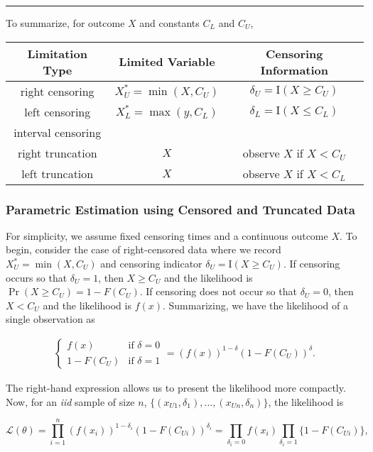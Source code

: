 \documentclass[]{book}
\theoremstyle{definition}
\theoremstyle{definition}
\theoremstyle{definition}
\theoremstyle{remark}
\begin{document}
\begin{center}\rule{0.5\linewidth}{\linethickness}\end{center}

To summarize, for outcome \(X\) and constants \(C_L\) and \(C_U\),

\begin{longtable}[]{@{}ccc@{}}
\toprule
Limitation Type & Limited Variable & Censoring
Information\tabularnewline
\midrule
\endhead
right censoring & \(X_U^{\ast}= \min(X, C_U)\) &
\(\delta_U= \mathrm{I}(X \geq C_U)\)\tabularnewline
left censoring & \(X_L^{\ast}= \max(y, C_L)\) &
\(\delta_L= \mathrm{I}(X \leq C_L)\)\tabularnewline
interval censoring & &\tabularnewline
right truncation & \(X\) & observe \(X\) if \(X < C_U\)\tabularnewline
left truncation & \(X\) & observe \(X\) if \(X < C_L\)\tabularnewline
\bottomrule
\end{longtable}

\subsubsection{Parametric Estimation using Censored and Truncated
Data}\label{parametric-estimation-using-censored-and-truncated-data}

For simplicity, we assume fixed censoring times and a continuous outcome
\(X\). To begin, consider the case of right-censored data where we
record \(X_U^{\ast}= \min(X, C_U)\) and censoring indicator
\(\delta_U= \mathrm{I}(X \geq C_U)\). If censoring occurs so that
\(\delta_U=1\), then \(X \geq C_U\) and the likelihood is
\(\Pr(X \geq C_U) = 1-F(C_U)\). If censoring does not occur so that
\(\delta_U=0\), then \(X < C_U\) and the likelihood is \(f(x)\).
Summarizing, we have the likelihood of a single observation as

\[\begin{aligned}
\left\{
\begin{array}{ll}
f(x) & \text{if } \delta = 0 \\
1-F(C_U) & \text{if }\delta=1
\end{array}
\right. = \left( f(x)\right)^{1-\delta} \left(1-F(C_U)\right)^{\delta} .
\end{aligned}\]

The right-hand expression allows us to present the likelihood more
compactly. Now, for an \emph{iid} sample of size \(n\),
\(\{ (x_{U1},\delta_1), \ldots,(x_{Un}, \delta_n) \}\), the likelihood
is

\[\mathcal{L}(\theta) = \prod_{i=1}^n \left( f(x_i)\right)^{1-\delta_i} \left(1-F(C_{Ui})\right)^{\delta_i} = \prod_{\delta_i=0} f(x_i) \prod_{\delta_i=1} \{1-F(C_{Ui})\},\]
\end{document}
